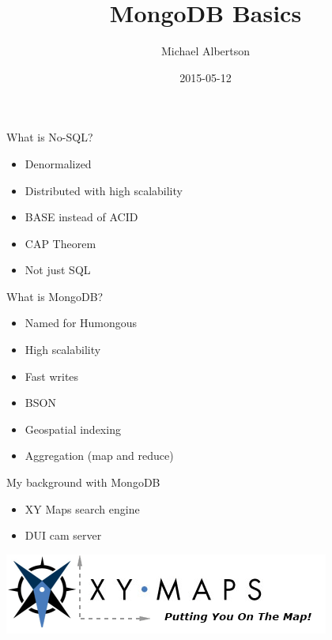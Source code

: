 \documentclass{beamer}
\title{MongoDB Basics}
\author{Michael Albertson}
\date{2015-05-12}
\begin{document}
\begin{frame}

\maketitle

\end{frame}


\begin{frame}{What is No-SQL?}

\begin{itemize}
\item Denormalized
\item Distributed with high scalability
\item BASE instead of ACID %
\item CAP Theorem
\item Not just SQL
\end{itemize}

\end{frame}


\begin{frame}{What is MongoDB?}

\begin{itemize}
\item Named for Humongous
\item High scalability
\item Fast writes
\item BSON
\item Geospatial indexing
\item Aggregation (map and reduce)
\end{itemize}

\end{frame}


\begin{frame}{My background with MongoDB}

\begin{itemize}
\item XY Maps search engine
\item DUI cam server
\end{itemize}

\begin{center}
\includegraphics[scale=.5]{xy-logo.png}
\end{center}

\end{frame}
\end{document}
